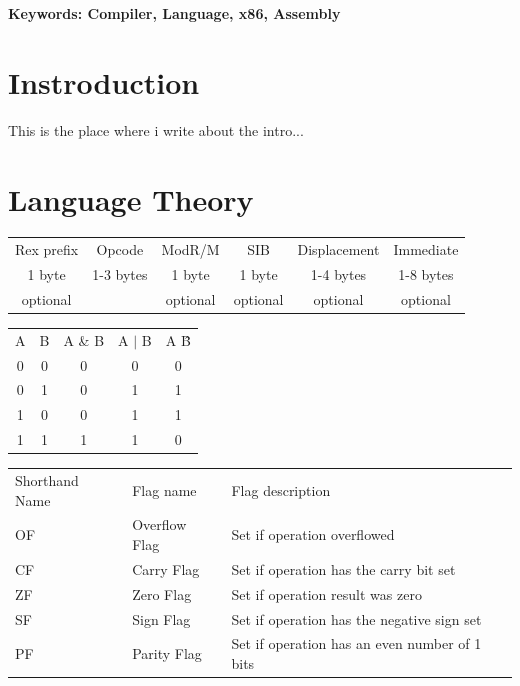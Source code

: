 \documentclass[a4paper,oneside,onecolumn,12pt]{LegrandOrangeBook}
\begin{document}
\textbf{Keywords: Compiler, Language, x86, Assembly}

\chapter*{Instroduction}
This is the place where i write about the intro...

\chapter{Language Theory}
\begin{center}
    \begin{tabular}{|c|c|c|c|c|c|}
        Rex prefix & Opcode & ModR/M & SIB & Displacement & Immediate \\
        1 byte & 1-3 bytes & 1 byte & 1 byte & 1-4 bytes & 1-8 bytes \\
        optional &  & optional & optional & optional & optional
    \end{tabular}
\end{center}
\begin{center}
    \begin{tabular}{|c|c|c|c|c|}
        A & B & A \& B & A $|$ B & A \^ B \\
        0 & 0 & 0 & 0 & 0 \\
        0 & 1 & 0 & 1 & 1 \\
        1 & 0 & 0 & 1 & 1 \\
        1 & 1 & 1 & 1 & 0
    \end{tabular}
\end{center}
\begin{center}
    \begin{tabular}{|l|l|l|}
        Shorthand Name & Flag name & Flag description \\
        OF & Overflow Flag & Set if operation overflowed \\
        CF & Carry Flag & Set if operation has the carry bit set \\
        ZF & Zero Flag & Set if operation result was zero \\
        SF & Sign Flag & Set if operation has the negative sign set \\
        PF & Parity Flag & Set if operation has an even number of 1 bits \\
    \end{tabular}
\end{center}
\end{document}
